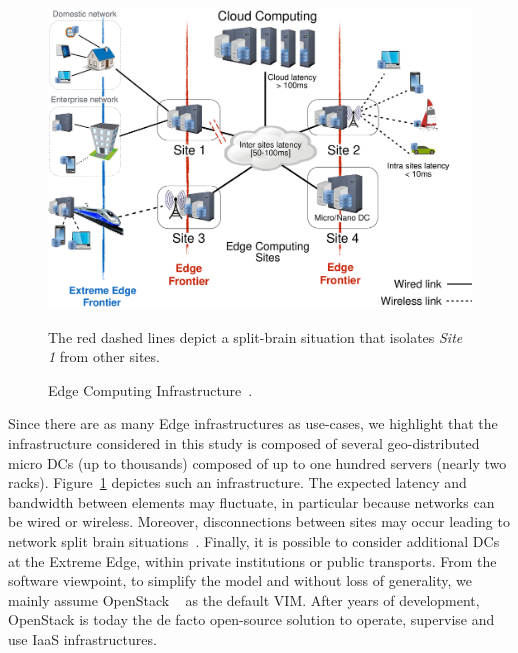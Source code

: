 \begin{figure}[t]
  \centering
  \includegraphics[width=.95\columnwidth]{./figures/figure_fog.pdf}
    \vspace*{-.4cm}
  \caption{Edge Computing Infrastructure~\cite{7923796}.}
    {\small The red dashed lines depict a split-brain situation that isolates
    \emph{Site 1} from other sites.}
  \label{fig:fogedge-archi}
  \vspace*{-.5cm}
\end{figure}

Since there are as many Edge infrastructures as use-cases, we
highlight that the infrastructure considered in this
study is composed
 of several
geo-distributed micro DCs (up to thousands)
composed of up to one hundred servers (nearly two racks).
Figure~\ref{fig:fogedge-archi} depictes such an infrastructure.
The expected latency and bandwidth between elements may fluctuate, in particular because
networks can be wired or wireless. Moreover, disconnections
between sites may occur leading to network split brain
situations~\cite{4456903}.
Finally, it is possible to consider additional DCs at the Extreme Edge, within private institutions or public transports.
%
From the software viewpoint, to simplify the model and
without loss of generality, we mainly assume OpenStack ~\cite{openstack:www} as the default VIM.  After years of development, OpenStack is today the de facto open-source solution to operate, supervise and use
IaaS infrastructures.


